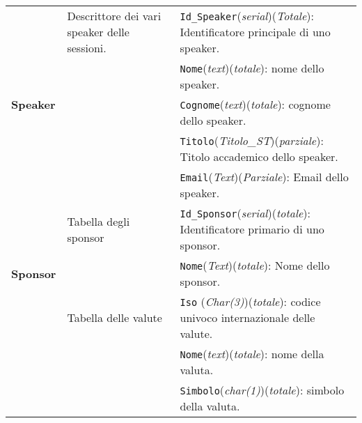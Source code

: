 \begin{longtable}{|p{}|p{}|p{}|}
	\hline
	\multirow{5}{*}{\textbf{Speaker}} & Descrittore dei vari speaker delle sessioni. & \texttt{Id\_Speaker}(\textit{serial})(\textit{Totale}): Identificatore principale di uno speaker. \\
	& & \texttt{Nome}(\textit{text})(\textit{totale}): nome dello speaker. \\
	& & \texttt{Cognome}(\textit{text})(\textit{totale}): cognome dello speaker. \\
	& & \texttt{Titolo}(\textit{Titolo\_ST})(\textit{parziale}): Titolo accademico dello speaker. \\
	& & \texttt{Email}(\textit{Text})(\textit{Parziale}): Email dello speaker. \\
	\hline
	\multirow{3}{*}{\textbf{Sponsor}} & Tabella degli sponsor & \texttt{Id\_Sponsor}(\textit{serial})(\textit{totale}): Identificatore primario di uno sponsor. \\
	& & \texttt{Nome}(\textit{Text})(\textit{totale}): Nome dello sponsor. \\
	\hline
	\multirow{3}{*}{\textbf{Valuta}} & Tabella delle valute & \texttt{Iso} (\textit{Char(3)})(\textit{totale}): codice univoco internazionale delle valute. \\
	& & \texttt{Nome}(\textit{text})(\textit{totale}): nome della valuta. \\
	& & \texttt{Simbolo}(\textit{char(1)})(\textit{totale}): simbolo della valuta.\\
\end{longtable}